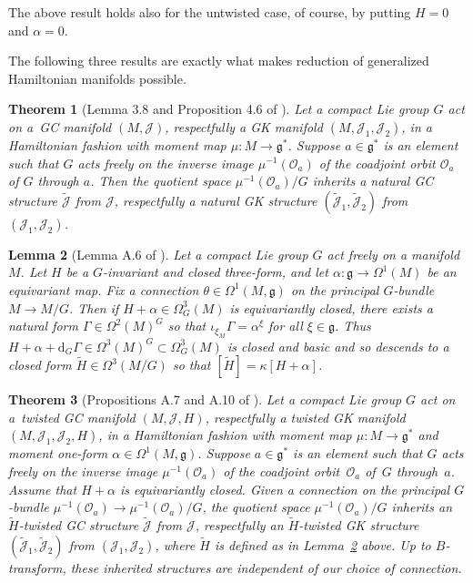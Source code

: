 \documentclass[pdftex]{sigma}
\newtheorem{Theorem}{Theorem}[section]
\newtheorem{Lemma}[Theorem]{Lemma}
\numberwithin{equation}{section}
\newcommand{\func}[3]{#1 \colon #2 \to #3}
\begin{document}
The above result holds also for the untwisted case, of course, by putting $H=0$ and $\alpha=0$.


The following three results are exactly what makes reduction of generalized Hamiltonian manifolds possible.


\begin{Theorem}[Lemma 3.8 and Proposition 4.6 of \cite{lintolman}] \label{thm4}
Let a compact Lie group $G$ act on a~GC manifold $(M,\mathcal{J})$, respectfully a GK manifold $(M,\mathcal{J}_1,\mathcal{J}_2)$, in a Hamiltonian fashion with moment map $\func{\mu}{M}{\mathfrak{g}^*}$.  Suppose $a \in \mathfrak{g}^*$ is an element such that $G$ acts freely on the inverse image $\mu^{-1}(\mathcal{O}_a)$ of the coadjoint orbit $\mathcal{O}_a$ of $G$ through $a$.  Then the quotient space $\mu^{-1}(\mathcal{O}_a) / G$ inherits a natural GC structure $\widetilde{\mathcal{J}}$ from $\mathcal{J}$, respectfully a natural GK structure $(\widetilde{\mathcal{J}}_1,\widetilde{\mathcal{J}}_2)$ from~$(\mathcal{J}_1,\mathcal{J}_2)$.
\end{Theorem}


\begin{Lemma}[Lemma A.6 of \cite{lintolman}]
\label{lem2}
Let a compact Lie group $G$ act freely on a manifold $M$.  Let $H$ be a $G$-invariant and closed three-form, and let $\func{\alpha}{\mathfrak{g}}{\Omega^1(M)}$ be an equivariant map.  Fix a connection $\theta \in \Omega^1(M, \mathfrak{g})$ on the principal $G$-bundle $M \to M/G$.  Then if $H+\alpha \in \Omega_G^3(M)$ is equivariantly closed, there exists a natural form $\Gamma \in \Omega^2(M)^G$ so that $\iota_{\xi_M} \Gamma = \alpha^{\xi}$ for all $\xi \in \mathfrak{g}$.  Thus $H + \alpha + \mathrm{d}_G \Gamma \in \Omega^3(M)^G \subset \Omega_G^3(M)$ is closed and basic and so descends to a closed form $\widetilde{H} \in \Omega^3(M/G)$ so that $[\widetilde{H}] = \kappa[H+\alpha]$.
\end{Lemma}


\begin{Theorem}[Propositions A.7 and A.10 of \cite{lintolman}] \label{thm5}
Let a compact Lie group $G$ act on a~twisted GC manifold $(M,\mathcal{J},H)$, respectfully a twisted GK manifold $(M,\mathcal{J}_1,\mathcal{J}_2,H)$, in a Hamiltonian fashion with moment map $\func{\mu}{M}{\mathfrak{g}^*}$ and moment one-form $\alpha \in \Omega^1(M,\mathfrak{g})$.  Suppose $a \in \mathfrak{g}^*$ is an element such that $G$ acts freely on the inverse image $\mu^{-1}(\mathcal{O}_a)$ of the coadjoint orbit~$\mathcal{O}_a$ of~$G$ through~$a$.  Assume that $H+\alpha$ is equivariantly closed.
Given a connection on the principal $G$-bundle $\mu^{-1}(\mathcal{O}_a) \to \mu^{-1}(\mathcal{O}_a)/G$, the quotient space $\mu^{-1}(\mathcal{O}_a) / G$ inherits an $\widetilde{H}$-twisted GC structure $\widetilde{\mathcal{J}}$ from $\mathcal{J}$, respectfully an $\widetilde{H}$-twisted GK structure $(\widetilde{\mathcal{J}}_1,\widetilde{\mathcal{J}}_2)$ from $(\mathcal{J}_1,\mathcal{J}_2)$, where $\widetilde{H}$ is defined as in Lemma~{\rm \ref{lem2}} above.  Up to $B$-transform, these inherited structures are independent of our choice of connection.
\end{Theorem}
\end{document}
